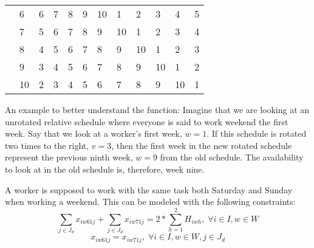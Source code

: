\begin{table}[H]
\begin{tabular}{llllllllllll}
    & \multicolumn{1}{l|}{6}  & \multicolumn{1}{l|}{6}  & \multicolumn{1}{l|}{7}  & \multicolumn{1}{l|}{8}  & \multicolumn{1}{l|}{9}  & \multicolumn{1}{l|}{10} & \multicolumn{1}{l|}{1}  & \multicolumn{1}{l|}{2}  & \multicolumn{1}{l|}{3}  & \multicolumn{1}{l|}{4}  & \multicolumn{1}{l|}{5}  \\ \cline{3-12} 
    & \multicolumn{1}{l|}{7}  & \multicolumn{1}{l|}{5}  & \multicolumn{1}{l|}{6}  & \multicolumn{1}{l|}{7}  & \multicolumn{1}{l|}{8}  & \multicolumn{1}{l|}{9}  & \multicolumn{1}{l|}{10} & \multicolumn{1}{l|}{1}  & \multicolumn{1}{l|}{2}  & \multicolumn{1}{l|}{3}  & \multicolumn{1}{l|}{4}  \\ \cline{3-12} 
    & \multicolumn{1}{l|}{8}  & \multicolumn{1}{l|}{4}  & \multicolumn{1}{l|}{5}  & \multicolumn{1}{l|}{6}  & \multicolumn{1}{l|}{7}  & \multicolumn{1}{l|}{8}  & \multicolumn{1}{l|}{9}  & \multicolumn{1}{l|}{10} & \multicolumn{1}{l|}{1}  & \multicolumn{1}{l|}{2}  & \multicolumn{1}{l|}{3}  \\ \cline{3-12} 
    & \multicolumn{1}{l|}{9}  & \multicolumn{1}{l|}{3}  & \multicolumn{1}{l|}{4}  & \multicolumn{1}{l|}{5}  & \multicolumn{1}{l|}{6}  & \multicolumn{1}{l|}{7}  & \multicolumn{1}{l|}{8}  & \multicolumn{1}{l|}{9}  & \multicolumn{1}{l|}{10} & \multicolumn{1}{l|}{1}  & \multicolumn{1}{l|}{2}  \\ \cline{3-12} 
    & \multicolumn{1}{l|}{10} & \multicolumn{1}{l|}{2}  & \multicolumn{1}{l|}{3}  & \multicolumn{1}{l|}{4}  & \multicolumn{1}{l|}{5}  & \multicolumn{1}{l|}{6}  & \multicolumn{1}{l|}{7}  & \multicolumn{1}{l|}{8}  & \multicolumn{1}{l|}{9}  & \multicolumn{1}{l|}{10} & \multicolumn{1}{l|}{1}  \\ \cline{3-12} 
\end{tabular}
\end{table}
An example to better understand the function: Imagine that we are looking at an unrotated relative schedule where everyone is said to work weekend the first week. Say that we look at a worker's first week, $w=1$. If this schedule is rotated two times to the right, $v=3$, then the first week in the new rotated schedule represent the previous ninth week, $w=9$ from the old schedule. The availability to look at in the old schedule is, therefore, week nine.

A worker is supposed to work with the same task both Saturday and Sunday when working a weekend. This can be modeled with the following constraints:
\begin{equation} \label{constr:consecutive_days}
\sum_{j \in J_d} x_{iw61j} + \sum_{j \in J_d} x_{iw71j} = 2*\sum_{h = 1}^{2} H_{iwh}, \; \forall i\in I, w \in W
\end{equation}
\begin{equation} \label{constr:same_tasks}
x_{iw61j} = x_{iw71j}, \; \forall i\in I, w \in W, j \in J_d
\end{equation}

